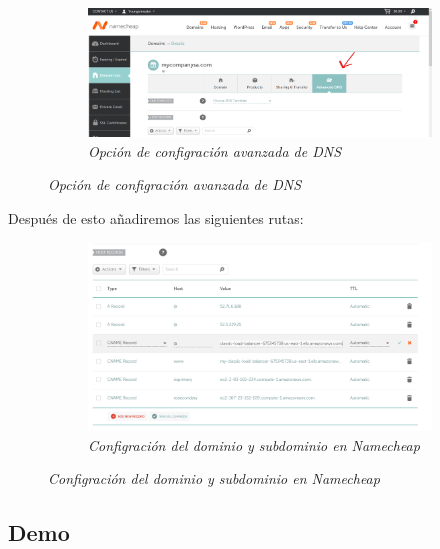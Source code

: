 \begin{figure}[H]
    \centering
    \begin{subfigure}[b]{0.8\textwidth}
        \centering
        \includegraphics[width=\textwidth]{Figures/0. General/advanced_config_selection.png}
        \caption{\textit{Opción de configración avanzada de DNS}}
        \label{fig: advanced dns configuration}
    \end{subfigure}
\end{figure}

Después de esto añadiremos las siguientes rutas:

\begin{figure}[H]
    \centering
    \begin{subfigure}[b]{0.8\textwidth}
        \centering
        \includegraphics[width=\textwidth]{Figures/0. General/domain_config.png}
        \caption{\textit{Configración del dominio y subdominio en Namecheap}}
        \label{fig: domain configuration}
    \end{subfigure}
\end{figure}

\subsection{Demo}